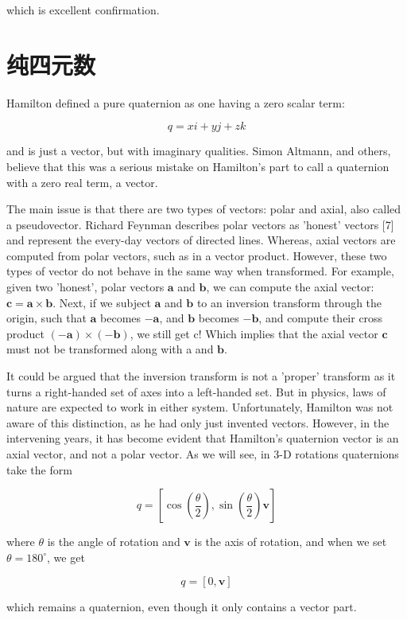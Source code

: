 which is excellent confirmation.

\section{纯四元数}
Hamilton defined a pure quaternion as one having a zero scalar term:

$$
    q=x i+y j+z k
$$

and is just a vector, but with imaginary qualities. Simon Altmann, and others, believe that this was a serious mistake on Hamilton's part to call a quaternion with a zero real term, a vector.

The main issue is that there are two types of vectors: polar and axial, also called a pseudovector. Richard Feynman describes polar vectors as 'honest' vectors [7] and represent the every-day vectors of directed lines. Whereas, axial vectors are computed from polar vectors, such as in a vector product. However, these two types of vector do not behave in the same way when transformed. For example, given two 'honest', polar vectors $\mathbf{a}$ and $\mathbf{b}$, we can compute the axial vector: $\mathbf{c}=\mathbf{a} \times \mathbf{b}$. Next, if we subject $\mathbf{a}$ and $\mathbf{b}$ to an inversion transform through the origin, such that $\mathbf{a}$ becomes $-\mathbf{a}$, and $\mathbf{b}$ becomes $-\mathbf{b}$, and compute their cross product $(-\mathbf{a}) \times(-\mathbf{b})$, we still get c! Which implies that the axial vector $\mathbf{c}$ must not be transformed along with a and $\mathbf{b}$.

It could be argued that the inversion transform is not a 'proper' transform as it turns a right-handed set of axes into a left-handed set. But in physics, laws of nature are expected to work in either system. Unfortunately, Hamilton was not aware of this distinction, as he had only just invented vectors. However, in the intervening years, it has become evident that Hamilton's quaternion vector is an axial vector, and not a polar vector. As we will see, in 3-D rotations quaternions take the form

$$
    q=\left[\cos \left(\frac{\theta}{2}\right), \sin \left(\frac{\theta}{2}\right) \mathbf{v}\right]
$$

where $\theta$ is the angle of rotation and $\mathbf{v}$ is the axis of rotation, and when we set $\theta=180^{\circ}$, we get

$$
    q=[0, \mathbf{v}]
$$

which remains a quaternion, even though it only contains a vector part.


